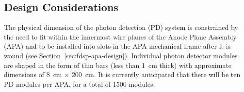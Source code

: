 


\subsection{Design Considerations}
\label{sec:fdsp-pd-des-consid}

The physical dimension of the photon detection (PD) system is constrained by the need to fit within the innermost wire planes of the Anode Plane Assembly (APA) and to be installed into slots in the APA mechanical frame after it is wound (see Section~\ref{sec:fdsp-apa-design}). 
Individual photon detector modules are shaped in the form of thin bars (less than \SI{1}{cm} thick) with approximate dimensions of \SI{8}{cm} $\times$ \SI{200}{cm}. It is currently anticipated that there will be ten PD modules per APA, for a total of \num{1500} modules. 


